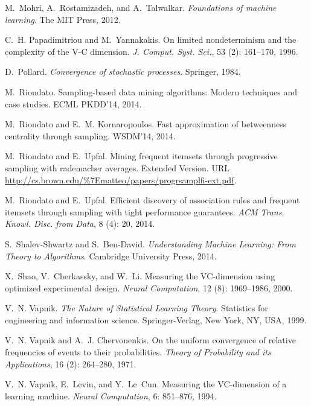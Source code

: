 \begin{thebibliography}{20}
M.~Mohri, A.~Rostamizadeh, and A.~Talwalkar.
\newblock \emph{Foundations of machine learning}.
\newblock The MIT Press, 2012.

C.~H. Papadimitriou and M.~Yannakakis.
\newblock On limited nondeterminism and the complexity of the {V-C} dimension.
\newblock \emph{J. Comput. Syst. Sci.}, 53 (2): 161--170,
  1996.

D.~Pollard.
\newblock \emph{Convergence of stochastic processes}.
\newblock Springer, 1984.

M.~Riondato.
\newblock Sampling-based data mining algorithms: Modern techniques and case
  studies.
\newblock ECML PKDD'14, 2014.

M.~Riondato and E.~M. Kornaropoulos.
\newblock Fast approximation of betweenness centrality through sampling.
\newblock WSDM'14, 2014.

M.~Riondato and E.~Upfal.
\newblock Mining frequent itemsets through progressive sampling with rademacher
  averages.
\newblock Extended Version.
\newblock URL \url{http://cs.brown.edu/%7Ematteo/papers/progrsamplfi-ext.pdf}.

M.~Riondato and E.~Upfal.
\newblock Efficient discovery of association rules and frequent itemsets
  through sampling with tight performance guarantees.
\newblock \emph{ACM Trans. Knowl. Disc. from Data}, 8 (4):
  20, 2014.

S.~Shalev-Shwartz and S.~Ben-David.
\newblock \emph{Understanding Machine Learning: From Theory to Algorithms}.
\newblock Cambridge University Press, 2014.

X.~Shao, V.~Cherkassky, and W.~Li.
\newblock Measuring the {VC}-dimension using optimized experimental design.
\newblock \emph{Neural Computation}, 12 (8): 1969--1986,
  2000.

V.~N. Vapnik.
\newblock \emph{The Nature of Statistical Learning Theory}.
\newblock Statistics for engineering and information science. Springer-Verlag,
  New York, NY, USA, 1999.

V.~N. Vapnik and A.~J. Chervonenkis.
\newblock On the uniform convergence of relative frequencies of events to their
  probabilities.
\newblock \emph{Theory of Probability and its Applications}, 16
  (2): 264--280, 1971.

V.~N. Vapnik, E.~Levin, and Y.~Le~Cun.
\newblock Measuring the {VC}-dimension of a learning machine.
\newblock \emph{Neural Computation}, 6: 851--876, 1994.

\end{thebibliography}
